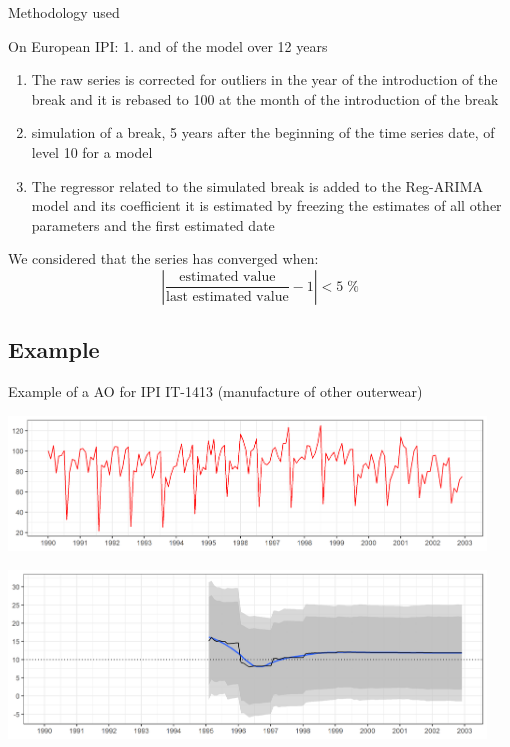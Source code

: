 \documentclass[10pt,xcolor=table,color={dvipsnames,usenames},ignorenonframetext,usepdftitle=false,french]{beamer}
\begin{document}
\begin{frame}{Methodology used}

On European IPI: 1.  and
 of the model over 12 years

\begin{enumerate}
\def\labelenumi{\arabic{enumi}.}
\setcounter{enumi}{1}
\item
  The raw series is corrected for outliers in the year of the
  introduction of the break and it is rebased to 100 at the month of the
  introduction of the break
\item
  simulation of a break, 5 years after the beginning of the time series
  date, of level 10 for a  model
\item
  The regressor related to the simulated break is added to the Reg-ARIMA
  model and its coefficient it is estimated by freezing the estimates of
  all other parameters and  the first estimated
  date
\end{enumerate}

We considered that the series has converged when:
\[\left\lvert\frac{\text{estimated value}}{\text{last estimated value}}-1\right\rvert < 5\;\%\]

\end{frame}

\subsection{Example}\label{example}

\begin{frame}{Example of a AO for IPI IT-1413 (manufacture of other
outerwear)}

\centering

\includegraphics[width=0.95\textwidth]{img/AO_ipi_it1413_y.png}

\includegraphics[width=0.95\textwidth]{img/AO_ipi_it1413_est.png}

\end{frame}
\end{document}
